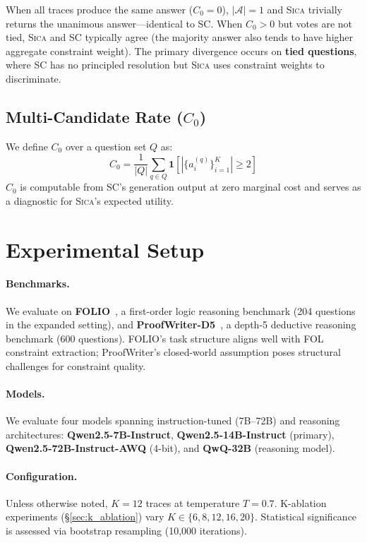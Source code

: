 \documentclass[11pt,a4paper]{article}
\newcommand{\sica}{\textsc{Sica}}
\begin{document}
When all traces produce the same answer ($C_0 = 0$), $|\mathcal{A}| = 1$ and \sica{} trivially returns the unanimous answer---identical to SC.
When $C_0 > 0$ but votes are not tied, \sica{} and SC typically agree (the majority answer also tends to have higher aggregate constraint weight).
The primary divergence occurs on \textbf{tied questions}, where SC has no principled resolution but \sica{} uses constraint weights to discriminate.

\subsection{Multi-Candidate Rate ($C_0$)}

We define $C_0$ over a question set $Q$ as:
\begin{equation}
C_0 = \frac{1}{|Q|} \sum_{q \in Q} \mathbf{1}\left[|\{a_i^{(q)}\}_{i=1}^K| \geq 2\right]
\end{equation}
$C_0$ is computable from SC's generation output at zero marginal cost and serves as a diagnostic for \sica{}'s expected utility.

\section{Experimental Setup}
\label{sec:setup}

\paragraph{Benchmarks.}
We evaluate on \textbf{FOLIO}~\citep{han2022folio}, a first-order logic reasoning benchmark (204 questions in the expanded setting), and \textbf{ProofWriter-D5}~\citep{tafjord2021proofwriter}, a depth-5 deductive reasoning benchmark (600 questions).
FOLIO's task structure aligns well with FOL constraint extraction; ProofWriter's closed-world assumption poses structural challenges for constraint quality.

\paragraph{Models.}
We evaluate four models spanning instruction-tuned (7B--72B) and reasoning architectures:
\textbf{Qwen2.5-7B-Instruct}, \textbf{Qwen2.5-14B-Instruct} (primary), \textbf{Qwen2.5-72B-Instruct-AWQ} (4-bit), and \textbf{QwQ-32B} (reasoning model).

\paragraph{Configuration.}
Unless otherwise noted, $K{=}12$ traces at temperature $T{=}0.7$.
K-ablation experiments (\S\ref{sec:k_ablation}) vary $K \in \{6, 8, 12, 16, 20\}$.
Statistical significance is assessed via bootstrap resampling (10,000 iterations).
\end{document}
